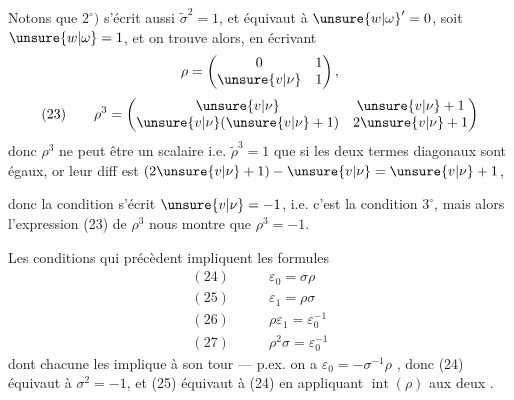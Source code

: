 Notons que $2^\circ)$ s'écrit aussi $\widetilde\sigma^2=1$, et équivaut à $\unsure{w|\omega}'=0$, soit $\unsure{w|\omega}=1$, et on trouve alors, en écrivant \deleted{\unsure{$\rho=$}} 
\[
\rho=\begin{pmatrix}0&1\\\unsure{v|\nu}&1\end{pmatrix},
\]
\[
(23)\qquad
\rho^3=\begin{pmatrix}\unsure{v|\nu}&\unsure{v|\nu}+1\\\unsure{v|\nu}(\unsure{v|\nu}+1)&2\unsure{v|\nu}+1\end{pmatrix}
\]
donc $\rho^3$ ne peut être un scalaire i.e. $\widetilde\rho^3=1$ que si les deux termes diagonaux sont égaux, or leur diff est $(2\unsure{v|\nu}+1)-\unsure{v|\nu}=\unsure{v|\nu}+1$,



donc la condition s'écrit $\unsure{v|\nu}=-1$, i.e. c'est la condition $3^\circ$, mais alors l'expression (23) de $\rho^3$ nous montre que $\rho^3=-1$.

\uline{} Les conditions qui précèdent impliquent les formules
\[
\begin{aligned}
(24)\qquad &\varepsilon_0=\sigma\rho\\
(25)\qquad &\varepsilon_1=\rho\sigma\\
(26)\qquad &\rho\varepsilon_1=\varepsilon_0^{-1}\\
(27)\qquad &\rho^2\sigma=\varepsilon_0^{-1}
\end{aligned}
\]
dont chacune  les implique à son tour
--- p.ex. on a $\varepsilon_0=-\sigma^{-1}\rho$ , donc (24) équivaut à  $\sigma^2=-1$, et (25) équivaut à (24) en appliquant $\operatorname{int}(\rho)$ aux deux .

